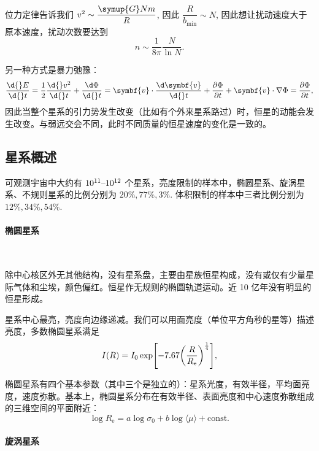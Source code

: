 \documentclass[../天体物理基础.tex]{subfiles}
\begin{document}
位力定律告诉我们 $v^{2}\sim\dfrac{\symup{G}Nm}{R}$, 因此 $\dfrac{R}{b_{\min}}\sim N$, 因此想让扰动速度大于原本速度，扰动次数要达到
\begin{equation}
n\sim\frac{1}{8\pi}\frac{N}{\ln N}.
\end{equation}

另一种方式是暴力弛豫：
\begin{equation}
\frac{\d{}E}{\d{}t}=\frac{1}{2}\frac{\d{}v^{2}}{\d{}t}+\frac{\d\Phi}{\d{}t}=\symbf{v}\cdot\frac{\d\symbf{v}}{\d{}t}+\frac{\partial\Phi}{\partial{}t}+\symbf{v}\cdot\nabla\Phi=\frac{\partial\Phi}{\partial{}t},
\end{equation}
因此当整个星系的引力势发生改变（比如有个外来星系路过）时，恒星的动能会发生改变。与弱远交会不同，此时不同质量的恒星速度的变化是一致的。

\subsection{星系概述}
可观测宇宙中大约有 $10^{11}\text{\textendash}10^{12}$ 个星系，亮度限制的样本中，椭圆星系、旋涡星系、不规则星系的比例分别为 $20\%, 77\%, 3\%$. 体积限制的样本中三者比例分别为 $12\%, 34\%, 54\%$.

\paragraph{椭圆星系}~{}

除中心核区外无其他结构，没有星系盘，主要由星族\uppercase\expandafter{}恒星构成，没有或仅有少量星际气体和尘埃，颜色偏红。恒星作无规则的椭圆轨道运动。近 10 亿年没有明显的恒星形成。

星系中心最亮，亮度向边缘递减。我们可以用面亮度（单位平方角秒的星等）描述亮度，多数椭圆星系满足
\begin{equation}
I\mleft(R\mright)=I_{0}\exp\mleft[-7.67\mleft(\frac{R}{R_{\mathrm{e}}}\mright)^{\frac{1}{4}}\mright],
\end{equation}

椭圆星系有四个基本参数（其中三个是独立的）：星系光度，有效半径，平均面亮度，速度弥散。基本上，椭圆星系分布在有效半径、表面亮度和中心速度弥散组成的三维空间的平面附近：
\begin{equation}
\log R_{\mathrm{e}}=a\log\sigma_{0}+b\log\langle\mu\rangle+\mathrm{const}.
\end{equation}

\paragraph{旋涡星系}~{}
\end{document}
